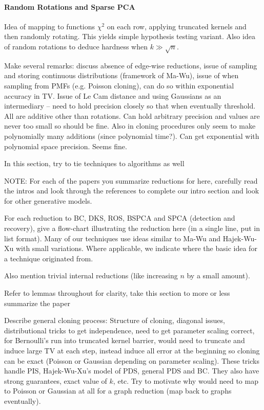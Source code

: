 \documentclass[11pt]{article}
\begin{document}
\paragraph{Random Rotations and Sparse PCA} Idea of mapping to functions $\chi^2$ on each row, applying truncated kernels and then randomly rotating. This yields simple hypothesis testing variant. Also idea of random rotations to deduce hardness when $k \gg \sqrt{n}$.

Make several remarks: discuss absence of edge-wise reductions, issue of sampling and storing continuous distributions (framework of Ma-Wu), issue of when sampling from PMFs (e.g. Poisson cloning), can do so within exponential accuracy in TV. Issue of Le Cam distance and using Gaussians as an intermediary -- need to hold precision closely so that when eventually threshold. All are additive other than rotations. Can hold arbitrary precision and values are never too small so should be fine. Also in cloning procedures only seem to make polynomially many additions (since polynomial time?). Can get exponential with polynomial space precision. Seems fine.

In this section, try to tie techniques to algorithms as well

NOTE: For each of the papers you summarize reductions for here, carefully read the intros and look through the references to complete our intro section and look for other generative models.

For each reduction to BC, DKS, ROS, BSPCA and SPCA (detection and recovery), give a flow-chart illustrating the reduction here (in a single line, put in list format). Many of our techniques use ideas similar to Ma-Wu and Hajek-Wu-Xu with small variations. Where applicable, we indicate where the basic idea for a technique originated from.

Also mention trivial internal reductions (like increasing $n$ by a small amount).

Refer to lemmas throughout for clarity, take this section to more or less summarize the paper

Describe general cloning process: Structure of cloning, diagonal issues, distributional tricks to get independence, need to get parameter scaling correct, for Bernoulli's run into truncated kernel barrier, would need to truncate and induce large TV at each step, instead induce all error at the beginning so cloning can be exact (Poisson or Gaussian depending on parameter scaling). These tricks handle PIS, Hajek-Wu-Xu's model of PDS, general PDS and BC. They also have strong guarantees, exact value of $k$, etc. Try to motivate why would need to map to Poisson or Gaussian at all for a graph reduction (map back to graphs eventually).
\end{document}

